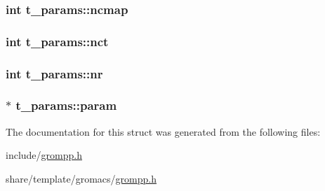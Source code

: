 \hypertarget{structt__params_a88fdbf63389fd20d1f072fbafc3d52d5}{
\subsubsection[{ncmap}]{\setlength{\rightskip}{0pt plus 5cm}int {\bf t\-\_\-params\-::ncmap}}}\label{structt__params_a88fdbf63389fd20d1f072fbafc3d52d5}
\hypertarget{structt__params_af4a4c49f0c529976c1284e1ba0112834}{
\subsubsection[{nct}]{\setlength{\rightskip}{0pt plus 5cm}int {\bf t\-\_\-params\-::nct}}}\label{structt__params_af4a4c49f0c529976c1284e1ba0112834}
\hypertarget{structt__params_adb6ca69becaf8ee546ffe42b84c0aabb}{
\subsubsection[{nr}]{\setlength{\rightskip}{0pt plus 5cm}int {\bf t\-\_\-params\-::nr}}}\label{structt__params_adb6ca69becaf8ee546ffe42b84c0aabb}
\hypertarget{structt__params_a3b593041a5e75fe27680d28b3becb027}{
\subsubsection[{param}]{ $\ast$ {\bf t\-\_\-params\-::param}}}\label{structt__params_a3b593041a5e75fe27680d28b3becb027}


\-The documentation for this struct was generated from the following files\-:\begin{DoxyCompactItemize}
\item 
include/\hyperlink{include_2grompp_8h}{grompp.\-h}\item 
share/template/gromacs/\hyperlink{share_2template_2gromacs_2grompp_8h}{grompp.\-h}\end{DoxyCompactItemize}
